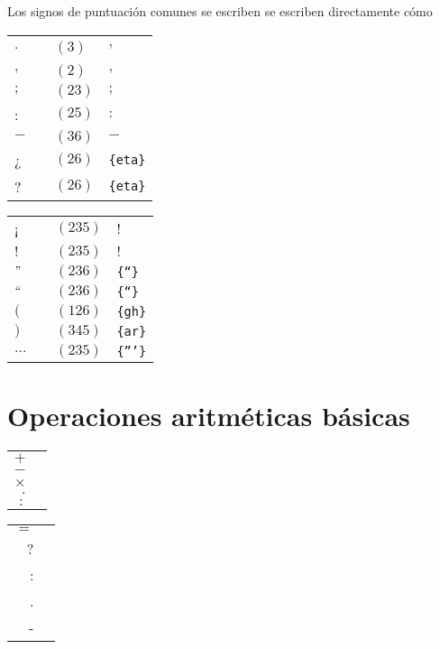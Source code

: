 \documentclass[draft]{article}
\newcommand{\mytable}[1]{%
    \enskip\begin{tabular}[t]{r|l} 
    \hline #1 \hline
    \end{tabular}\enskip}
\newcommand{\myagtable}[1]{%
	\enskip\begin{tabular}[t]{l|r|l|l} 
		\hline #1 \hline
	\end{tabular}\enskip}
\begin{document}
Los signos de puntuación comunes se escriben se escriben directamente cómo

\begin{center}
	\myagtable{
		$.$    &\braille{'}      & $(3)$  & '                  \\
		$,$    &\braille{,}      & $(2)$  & $,$                \\
		$;$    &\braille{;}      & $(23)$ & $;$                \\
		:      &\braille{:}      & $(25)$ & $:$                \\
		$-$    &\braille{-}      & $(36)$ & $-$                \\
		¿      &\braille{{en}}   & $(26)$ & \texttt{\{eta\}}   \\
		?      &\braille{{en}}   & $(26)$ & \texttt{\{eta\}}   \\	
	}
	\myagtable{
		¡      &\braille{!}      & $(235)$  & $!$\\
		$!$    &\braille{!}      & $(235)$  & $!$\\
		$"$    &\braille{{``}}   & $(236)$  & \texttt{\{``\}}  \\
		$``$   &\braille{{``}}   & $(236)$  & \texttt{\{``\}}  \\
		$($    &\braille{{gh}}   & $(126)$  & \texttt{\{gh\}}  \\
		$)$    &\braille{{ar}}   & $(345)$  & \texttt{\{ar\}}  \\
		$\dots$&\braille{'''}    & $(235)$  & \texttt{\{'''\}} \\
	}
\end{center}


\section{Operaciones aritméticas básicas}

\begin{center}
	\mytable{
		$+$&\braille{!}            \\
		$-$&\braille{-}            \\
		$\times$&\braille{{``}}    \\
		$.$&\braille{.}            \\
		$:$&\braille{.}            \\
	}
	\mytable{
		$=$&\braille{=} \\
		?&\braille{?} \\
		:&\braille{:}    \\
		.&\braille{.}    \\
		-&\braille{-} \\
	}
\end{center}
\end{document}
